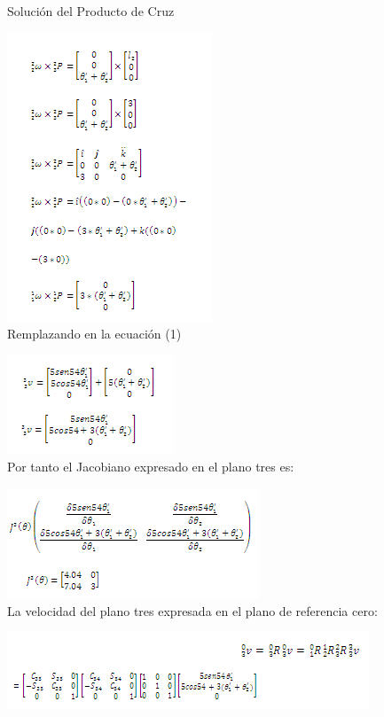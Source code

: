 \documentclass[12pt,a4paper]{report}
\begin{document}
  Solución del Producto de Cruz
  
  
  \hspace{4cm} \includegraphics{ecuacion8.png}\\
  
  Remplazando en la ecuación (1)
  
  
  \hspace{4cm} \includegraphics{ecuacion9.png}\\
  
  Por tanto el Jacobiano expresado en el plano tres es:
  
   \hspace{4cm} \includegraphics{ecuacion10.png}\\
  
  La velocidad del plano tres expresada en el plano de referencia cero:
  
  \hspace{4cm} \includegraphics{ecuacion11.png}\\
  
\end{document}
